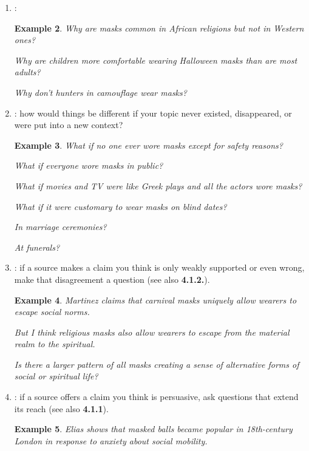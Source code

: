 \documentclass[oneside]{book}
\numberwithin{equation}{section}
\newtheorem{example}{Example}[section]
\begin{document}
\begin{enumerate}
\begin{example}
        What parts of masks are typically \emph{not} significant in religious ceremonies?
    \end{example}
    \item {}:
    \begin{example}
        Why are masks common in African religions but not in Western ones?
        
        Why are children more comfortable wearing Halloween masks than are most adults?
        
        Why don't hunters in camouflage wear masks?
    \end{example}
    \item {}: how would things be different if your topic never existed, disappeared, or were put into a new context?
    \begin{example}
        What if no one ever wore masks except for safety reasons?
        
        What if everyone wore masks in public?
        
        What if movies and TV were like Greek plays and all the actors wore masks?
        
        What if it were customary to wear masks on blind dates?
        
        In marriage ceremonies?
        
        At funerals?
    \end{example}
    \item {}: if a source makes a claim you think is only weakly supported or even wrong, make that disagreement a question (see also \textbf{4.1.2.}).
    \begin{example}
        Martinez claims that carnival masks uniquely allow wearers to escape social norms.
        
        But I think religious masks also allow wearers to escape from the material realm to the spiritual.
        
        Is there a larger pattern of all masks creating a sense of alternative forms of social or spiritual life?
    \end{example}
    \item {}: if a source offers a claim you think is persuasive, ask questions that extend its reach (see also \textbf{4.1.1}).
    \begin{example}
        Elias shows that masked balls became popular in 18th-century London in response to anxiety about social mobility.
        

\end{example}
\end{enumerate}
\end{document}

